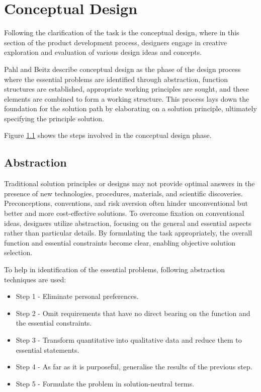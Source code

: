 \chapter{Conceptual Design}
Following the clarification of the task is the conceptual design, where in this section of the product development process, designers engage in creative exploration and evaluation of various design ideas and concepts.

Pahl and Beitz describe conceptual design as the phase of the design process where the essential problems are identified through abstraction, function structures are established, appropriate working principles are sought, and these elements are combined to form a working structure. This process lays down the foundation for the solution path by elaborating on a solution principle, ultimately specifying the principle solution. \cite{Pahl07d}

Figure \ref{} shows the steps involved in the conceptual design phase.


\section{Abstraction}
Traditional solution principles or designs may not provide optimal answers in the presence of new technologies, procedures, materials, and scientific discoveries. Preconceptions, conventions, and risk aversion often hinder unconventional but better and more cost-effective solutions. To overcome fixation on conventional ideas, designers utilize abstraction, focusing on the general and essential aspects rather than particular details. By formulating the task appropriately, the overall function and essential constraints become clear, enabling objective solution selection. \cite{Pahl07b}

To help in identification of the essential problems, following abstraction techniques are used:
\begin{itemize}
    \item Step 1 - Eliminate personal preferences.
    \item Step 2 - Omit requirements that have no direct bearing on the function and the essential constraints.
    \item Step 3 - Transform quantitative into qualitative data and reduce them to essential
          statements.
    \item Step 4 - As far as it is purposeful, generalise the results of the previous step.
    \item Step 5 - Formulate the problem in solution-neutral terms. \cite{Pahl07c}
\end{itemize}

